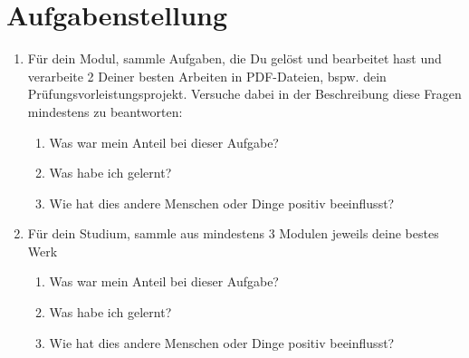 \documentclass[a4paper,oneside]{scrarticle}
\begin{document}
	\section*{Aufgabenstellung}

	\begin{enumerate}
		\item Für dein Modul, sammle Aufgaben, die Du gelöst und bearbeitet hast und verarbeite 2 Deiner besten Arbeiten in PDF-Dateien, bspw. dein Prüfungsvorleistungsprojekt. Versuche dabei in der Beschreibung diese Fragen mindestens zu beantworten:
		\begin{enumerate}
			\item Was war mein Anteil bei dieser Aufgabe?
			\item Was habe ich gelernt?
			\item Wie hat dies andere Menschen oder Dinge positiv beeinflusst?
		\end{enumerate}
		\item Für dein Studium, sammle aus mindestens 3 Modulen jeweils deine bestes Werk
		\begin{enumerate}
			\item Was war mein Anteil bei dieser Aufgabe?
			\item Was habe ich gelernt?
			\item Wie hat dies andere Menschen oder Dinge positiv beeinflusst?
		\end{enumerate}

	\end{enumerate}
\end{document}
